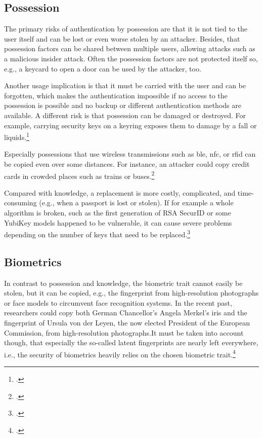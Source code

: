 	
\subsection{Possession}
\label{subsec:possession-threat}

The primary risks of authentication by possession are that it is not tied to the user itself and can be lost or even worse stolen by an attacker. Besides, that possession factors can be shared between multiple users, allowing attacks such as a malicious insider attack. Often the possession factors are not protected itself so, e.g., a keycard to open a door can be used by the attacker, too.

Another usage implication is that it must be carried with the user and can be forgotten, which makes the authentication impossible if no access to the possession is possible and no backup or different authentication methods are available. A different risk is that possession can be damaged or destroyed. For example, carrying security keys on a keyring exposes them to damage by a fall or liquids.\footcites[See][263--264]{shostack2014threat}

Especially possessions that use wireless transmissions such as \gls{ble}, \gls{nfc}, or \gls{rfid} can be copied even over some distances. For instance, an attacker could copy credit cards in crowded places such as trains or buses.\footcite[See][]{6892730}

Compared with knowledge, a replacement is more costly, complicated, and time-consuming (e.g., when a passport is lost or stolen). If for example a whole algorithm is broken, such as the first generation of RSA SecurID or some YubiKey models happened to be vulnerable, it can cause severe problems depending on the number of keys that need to be replaced.\footcites[See][18]{dasgupta2017multi}[See][]{BIRYUKOV2005364}[See][]{yubikey-heise}

\subsection{Biometrics}

In contrast to possession and knowledge, the biometric trait cannot easily be stolen, but it can be copied, e.g., the fingerprint from high-resolution photographs or 
face models to circumvent face recognition systems. In the recent past, researchers could copy both German Chancellor's Angela Merkel's iris and the fingerprint of Ursula von der Leyen, the now elected President of the European Commission, from high-resolution photographs.It must be taken into account though, that especially the so-called latent fingerprints are nearly left everywhere, i.e., the security of biometrics heavily relies on the chosen biometric trait.\footcites[See][]{185181}[See][]{220566}[See][e199]{MARTIN2013e189}[See][]{ccc-merkel}


